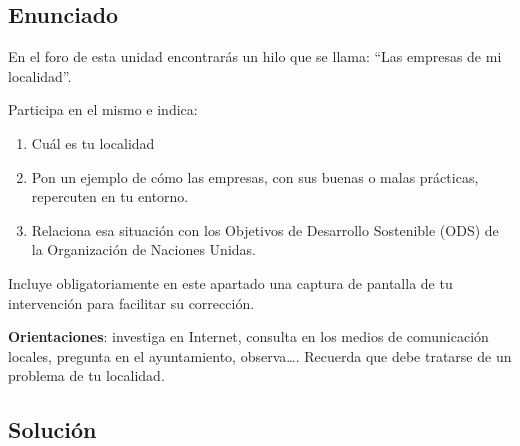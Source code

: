 \subsection{Enunciado}
En el foro de esta unidad encontrarás un hilo que se llama: “Las empresas de mi localidad”.

Participa en el mismo e indica:

\begin{enumerate}
    \item Cuál es tu localidad
    \item Pon un ejemplo de cómo las empresas, con sus buenas o malas prácticas, repercuten en tu entorno.
    \item Relaciona esa situación con los Objetivos de Desarrollo Sostenible (ODS) de la Organización de Naciones Unidas.
\end{enumerate}

Incluye obligatoriamente en este apartado una captura de pantalla de tu intervención para facilitar su corrección.

\textbf{Orientaciones}: investiga en Internet, consulta en los medios de comunicación locales, pregunta en el ayuntamiento, observa…. Recuerda que debe tratarse de un problema de tu localidad.

\subsection{Solución}


\newpage



